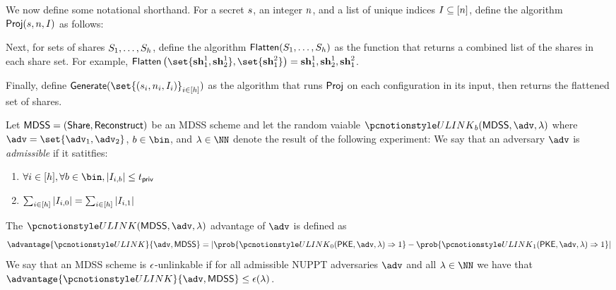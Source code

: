 We now define some notational shorthand.
For a secret $s$, an integer $n$, and a list of unique indices $I \subseteq [n]$, define the algorithm $\mathsf{Proj}(s, n, I)$ as follows:

Next, for sets of shares $S_1, \dots, S_{h}$, define the algorithm $\mathsf{Flatten}(S_1, \dots, S_{h})$ as the function that returns a combined list of the shares in each share set.
For example, $\mdssFlatten\left(\set{\mdssBlindShare^1_1, \mdssBlindShare^1_2}, \set{\mdssBlindShare^2_1}\right) = \mdssBlindShare^1_1, \mdssBlindShare^1_2, \mdssBlindShare^2_1$.

Finally, define $\mdssGenerate(\set{(\mdssSecret_i, \mdssNumShares_i, \indexSet_i)}_{i \in [\mdssNumShareSets]})$ as the algorithm that runs $\mathsf{Proj}$ on each configuration in its input, then returns the flattened set of shares.

\begin{definition}[Unlinkability]
	\label{def:unlinkability}
	Let $\mathsf{MDSS} = (\mathsf{Share}, \mathsf{Reconstruct})$ be an MDSS scheme and let the random vaiable $\ulink_b(\mdss, \adv, \secpar)$ where $\adv = \set{\adv_1, \adv_2}$, $b \in \bin$, and $\secpar \in \NN$ denote the result of the following experiment:
	We say that an adversary $\adv$ is \emph{admissible} if it satitfies:
	\begin{enumerate}
		\item $\forall i \in [\mdssNumShareSets], \forall b \in \bin, |\indexSet_{i, b}| \leq \mdssPrivThr$
		\item $\sum_{i \in [h]} |I_{i, 0}| = \sum_{i \in [h]} |I_{i, 1}|$
	\end{enumerate}

	The $\ulink(\mdss, \adv, \secpar)$ advantage of $\adv$ is defined as
	$$
		\advantage{\ulink}{\adv, \mdss} = \left|\prob{\ulink_0(\pke, \adv, \secpar) \Rightarrow 1} - \prob{\ulink_1(\pke, \adv, \secpar) \Rightarrow 1}\right|
	$$
	We say that an MDSS scheme is $\epsilon$-unlinkable if for all admissible NUPPT adversaries $\adv$ and all $\secpar \in \NN$ we have that $\advantage{\ulink}{\adv, \mdss} \leq \mdssULVar(\secpar)$.
\end{definition}



